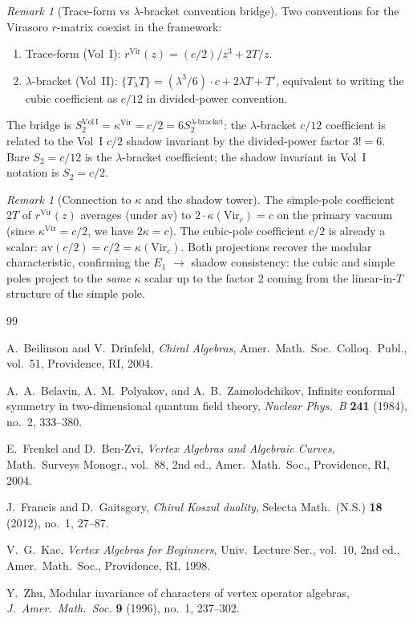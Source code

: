 \documentclass[11pt]{article}
\theoremstyle{definition}
\theoremstyle{remark}
\newtheorem{remark}[theorem]{Remark}
\newcommand{\Vir}{\mathrm{Vir}}
\numberwithin{equation}{section}
\begin{document}
\begin{remark}[Trace-form vs $\lambda$-bracket convention
bridge]\label{rem:convention-bridge-virr}
Two conventions for the Virasoro $r$-matrix coexist in the
framework:
\begin{enumerate}[label=\textup{(\roman*)}]
 \item Trace-form (Vol~I): $r^{\Vir}(z) = (c/2)/z^3 + 2T/z$.
 \item $\lambda$-bracket (Vol~II): $\{T_\lambda T\} = (\lambda^3/6)\cdot c +
 2\lambda T + T'$, equivalent to writing the cubic coefficient as
 $c/12$ in divided-power convention.
\end{enumerate}
The bridge is $S^{\mathrm{Vol\,I}}_2 = \kappa^{\Vir} = c/2 = 6
S^{\lambda\text{-bracket}}_2$: the $\lambda$-bracket
$c/12$ coefficient is related to the Vol~I $c/2$ shadow invariant by
the divided-power factor $3! = 6$. Bare $S_2 = c/12$ is the
$\lambda$-bracket coefficient; the shadow invariant in Vol~I
notation is $S_2 = c/2$.
\end{remark}

\begin{remark}[Connection to $\kappa$ and the shadow
tower]\label{rem:vir-to-kappa}
The simple-pole coefficient $2T$ of $r^{\Vir}(z)$ averages (under
$\mathrm{av}$) to $2 \cdot \kappa(\Vir_c) = c$ on the primary vacuum
(since $\kappa^{\Vir} = c/2$, we have $2\kappa = c$). The cubic-pole
coefficient $c/2$ is already a scalar: $\mathrm{av}(c/2) = c/2 =
\kappa(\Vir_c)$. Both projections recover the modular
characteristic, confirming the $E_1$ $\to$ shadow consistency:
the cubic and simple poles project to the \emph{same} $\kappa$ scalar
up to the factor $2$ coming from the linear-in-$T$ structure of the
simple pole.
\end{remark}

\begin{thebibliography}{99}

A.~Beilinson and V.~Drinfeld,
\emph{Chiral Algebras},
Amer.\ Math.\ Soc.\ Colloq.\ Publ., vol.~51,
Providence, RI, 2004.

A.~A.~Belavin, A.~M.~Polyakov, and A.~B.~Zamolodchikov,
Infinite conformal symmetry in two-dimensional quantum field
theory,
\emph{Nuclear Phys.\ B} \textbf{241} (1984), no.~2, 333--380.

E.~Frenkel and D.~Ben-Zvi,
\emph{Vertex Algebras and Algebraic Curves},
Math.\ Surveys Monogr., vol.~88, 2nd ed.,
Amer.\ Math.\ Soc., Providence, RI, 2004.

J.~Francis and D.~Gaitsgory,
\emph{Chiral Koszul duality},
Selecta Math.\ (N.S.) \textbf{18} (2012), no.~1, 27--87.

V.~G.~Kac,
\emph{Vertex Algebras for Beginners},
Univ.\ Lecture Ser., vol.~10, 2nd ed.,
Amer.\ Math.\ Soc., Providence, RI, 1998.

Y.~Zhu,
Modular invariance of characters of vertex operator algebras,
\emph{J.\ Amer.\ Math.\ Soc.} \textbf{9} (1996), no.~1, 237--302.

\end{thebibliography}
\end{document}
